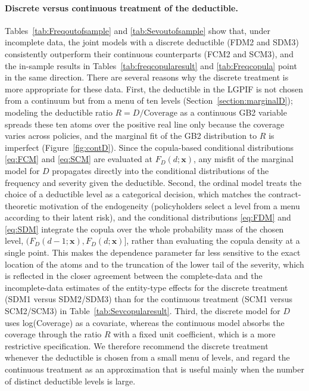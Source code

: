 \documentclass[11pt]{article}
\newcommand{\rev}[1]{{\color{blue}#1}}
\begin{document}
\rev{\paragraph{Discrete versus continuous treatment of the deductible.}
Tables~\ref{tab:Freqoutofsample} and \ref{tab:Sevoutofsample} show that, under incomplete data, the joint models with a discrete deductible (FDM2 and SDM3) consistently outperform their continuous counterparts (FCM2 and SCM3), and the in-sample results in Tables~\ref{tab:freqcopularesult} and \ref{tab:Freqcopula} point in the same direction. There are several reasons why the discrete treatment is more appropriate for these data. First, the deductible in the LGPIF is not chosen from a continuum but from a menu of ten levels (Section~\ref{section:marginalD}); modeling the deductible ratio $R=D/\text{Coverage}$ as a continuous GB2 variable spreads these ten atoms over the positive real line only because the coverage varies across policies, and the marginal fit of the GB2 distribution to $R$ is imperfect (Figure~\ref{fig:contD}). Since the copula-based conditional distributions \eqref{eq:FCM} and \eqref{eq:SCM} are evaluated at $F_D(d;\bm{x})$, any misfit of the marginal model for $D$ propagates directly into the conditional distributions of the frequency and severity given the deductible. Second, the ordinal model treats the choice of a deductible level as a categorical decision, which matches the contract-theoretic motivation of the endogeneity (policyholders select a level from a menu according to their latent risk), and the conditional distributions \eqref{eq:FDM} and \eqref{eq:SDM} integrate the copula over the whole probability mass of the chosen level, $(F_D(d-1;\bm{x}), F_D(d;\bm{x})]$, rather than evaluating the copula density at a single point. This makes the dependence parameter far less sensitive to the exact location of the atoms and to the truncation of the lower tail of the severity, which is reflected in the closer agreement between the complete-data and the incomplete-data estimates of the entity-type effects for the discrete treatment (SDM1 versus SDM2/SDM3) than for the continuous treatment (SCM1 versus SCM2/SCM3) in Table~\ref{tab:Sevcopularesult}. Third, the discrete model for $D$ uses log(Coverage) as a covariate, whereas the continuous model absorbs the coverage through the ratio $R$ with a fixed unit coefficient, which is a more restrictive specification. We therefore recommend the discrete treatment whenever the deductible is chosen from a small menu of levels, and regard the continuous treatment as an approximation that is useful mainly when the number of distinct deductible levels is large.}
\end{document}
